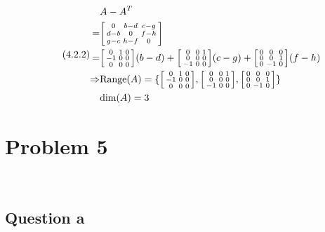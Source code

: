 \documentclass{article}
\begin{document}
\begin{equation}
\tag{4.2.2}
\begin{split}
&A-A^T\\
=&\begin{bsmallmatrix}0&b-d&c-g\\d-b&0&f-h\\g-c&h-f&0\end{bsmallmatrix}\\
=&\begin{bsmallmatrix}0&1&0\\-1&0&0\\0&0&0\end{bsmallmatrix}(b-d)+\begin{bsmallmatrix}0&0&1\\0&0&0\\-1&0&0\end{bsmallmatrix}(c-g)+\begin{bsmallmatrix}0&0&0\\0&0&1\\0&-1&0\end{bsmallmatrix}(f-h)\\
\Rightarrow &\text{Range}(A)=\{\begin{bsmallmatrix}0&1&0\\-1&0&0\\0&0&0\end{bsmallmatrix},\begin{bsmallmatrix}0&0&1\\0&0&0\\-1&0&0\end{bsmallmatrix},\begin{bsmallmatrix}0&0&0\\0&0&1\\0&-1&0\end{bsmallmatrix}\}\\
&\text{dim}(A)=3\\
\end{split}
\end{equation}

\newpage

\section{Problem 5}

~

\subsection{Question a}
\end{document}

